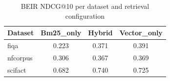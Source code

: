 \begin{table}[t]
\centering
\caption{BEIR NDCG@10 per dataset and retrieval configuration}
\label{tab:beir}
\begin{tabular}{lccc}
\toprule
Dataset & Bm25_only & Hybrid & Vector_only \\
\midrule
fiqa & 0.223 & 0.371 & 0.391 \\
nfcorpus & 0.306 & 0.367 & 0.369 \\
scifact & 0.682 & 0.740 & 0.725 \\
\bottomrule
\end{tabular}
\end{table}